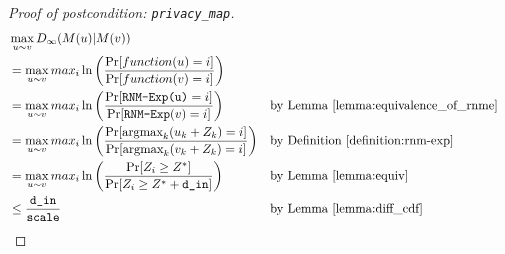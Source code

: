 \documentclass{article}
\begin{document}
\begin{proof}[Proof of postcondition: \texttt{privacy\_map}]
\begin{align}
    & \max_{u \sim v} D_\infty(M(u) | M(v)) \\
    & = \max_{u \sim v} max_i \ln\left(\frac{\Pr[function(u) = i]}{\Pr[function(v) = i]}\right) && \\
    & = \max_{u \sim v} max_i \ln\left(\frac{\Pr[\texttt{RNM-Exp(u)} = i]}{\Pr[\texttt{RNM-Exp}(v) = i]} \right) &&  \text{by Lemma \ref{lemma:equivalence_of_rnme}}\\
    & = \max_{u \sim v} max_i \ln\left(\frac{\Pr[\text{argmax}_k(u_k + Z_k) = i]}{\Pr[\text{argmax}_k(v_k + Z_k) = i]}\right) && \text{by Definition \ref{definition:rnm-exp}}  \\
    & = \max_{u \sim v} max_i \ln\left(\frac{\Pr[Z_i \geq Z^*]}{\Pr[Z_i \geq Z^* + \texttt{d\_in}]}\right) && \text{by Lemma \ref{lemma:equiv}}\\
    & \le \frac{\texttt{d\_in}}{\texttt{scale}} && \text{by Lemma \ref{lemma:diff_cdf}}
\end{align}
\end{proof}



\end{document}
